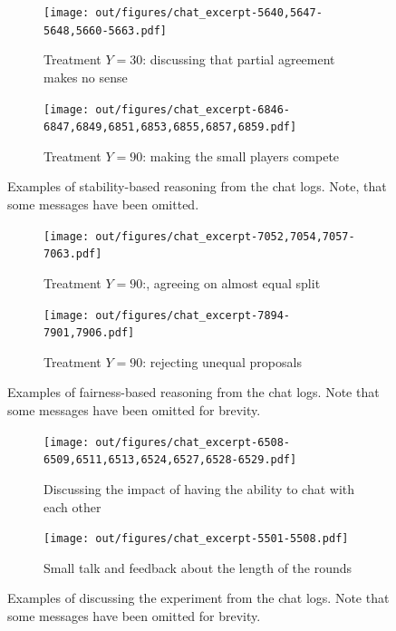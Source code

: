 \documentclass[12pt]{article}
\begin{document}
\begin{figure}[!htb]
    \centering
    \begin{subfigure}[b]{0.42\textwidth}
        \centering
        \texttt{[image: out/figures/chat\_excerpt-5640,5647-5648,5660-5663.pdf]}
        \caption{Treatment $Y=30$: discussing that partial agreement makes no sense}
        \label{fig:chat_stability_y30}
    \end{subfigure}
    \hspace{0.1\textwidth}
    \begin{subfigure}[b]{0.42\textwidth}
        \centering
        \texttt{[image: out/figures/chat\_excerpt-6846-6847,6849,6851,6853,6855,6857,6859.pdf]}
        \caption{Treatment $Y=90$: making the small players compete}
        \label{fig:chat_stability_y90}
    \end{subfigure}
    \caption{Examples of stability-based reasoning from the chat logs. Note, that some messages have been omitted.}
    \label{fig:chat_stability}
\end{figure}

\begin{figure}[!htb]
    \centering
    \begin{subfigure}[b]{0.42\textwidth}
        \centering
        \texttt{[image: out/figures/chat\_excerpt-7052,7054,7057-7063.pdf]}
        \caption{Treatment $Y=90$:, agreeing on almost equal split}
        \label{fig:chat_fairness_equal_split}
    \end{subfigure}
    \hspace{0.1\textwidth}
    \begin{subfigure}[b]{0.42\textwidth}
        \centering
        \texttt{[image: out/figures/chat\_excerpt-7894-7901,7906.pdf]}
        \caption{Treatment $Y=90$: rejecting unequal proposals}
        \label{fig:chat_fairness_reject_small}
    \end{subfigure}
    \caption{Examples of fairness-based reasoning from the chat logs. Note that some messages have been omitted for brevity.}
    \label{fig:chat_fairness}
\end{figure}

\begin{figure}[!htb]
    \centering
    \begin{subfigure}[b]{0.42\textwidth}
        \centering
        \texttt{[image: out/figures/chat\_excerpt-6508-6509,6511,6513,6524,6527,6528-6529.pdf]}
        \caption{Discussing the impact of having the ability to chat with each other}
        \label{fig:chat_meta_chat}
    \end{subfigure}
    \hspace{0.1\textwidth}
    \begin{subfigure}[b]{0.42\textwidth}
        \centering
        \texttt{[image: out/figures/chat\_excerpt-5501-5508.pdf]}
        \caption{Small talk and feedback about the length of the rounds}
        \label{fig:chat_meta_time}
    \end{subfigure}
    \caption{Examples of discussing the experiment from the chat logs. Note that some messages have been omitted for brevity.}
    \label{fig:chat_meta}
\end{figure}
\end{document}
